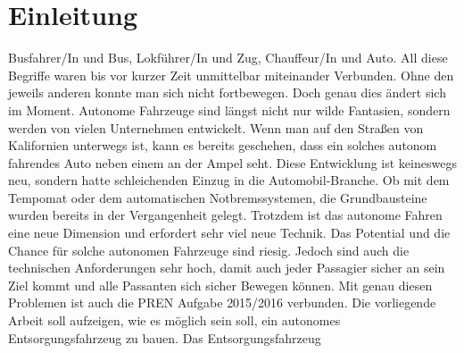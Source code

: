 \section{Einleitung}
Busfahrer/In und Bus, Lokführer/In und Zug, Chauffeur/In und Auto. All diese Begriffe waren bis vor kurzer Zeit unmittelbar miteinander Verbunden. Ohne den jeweils anderen konnte man sich nicht fortbewegen. Doch genau dies ändert sich im Moment. Autonome Fahrzeuge sind längst nicht nur wilde Fantasien, sondern werden von vielen Unternehmen entwickelt. Wenn man auf den Straßen von Kalifornien unterwegs ist, kann es bereits geschehen, dass ein solches autonom fahrendes Auto neben einem an der Ampel seht. Diese Entwicklung ist keineswegs neu, sondern hatte schleichenden Einzug in die Automobil-Branche. Ob mit dem Tempomat oder dem automatischen Notbremssystemen, die Grundbausteine wurden bereits in der Vergangenheit gelegt.
Trotzdem ist das autonome Fahren eine neue Dimension und erfordert sehr viel neue Technik. Das Potential und die Chance für solche autonomen Fahrzeuge sind riesig. Jedoch sind auch die technischen Anforderungen sehr hoch, damit auch jeder Passagier sicher an sein Ziel kommt und alle Passanten sich sicher Bewegen können. 
Mit genau diesen Problemen ist auch die PREN Aufgabe 2015/2016 verbunden. Die vorliegende Arbeit soll aufzeigen, wie es möglich sein soll, ein autonomes Entsorgungsfahrzeug zu bauen. Das Entsorgungsfahrzeug 
